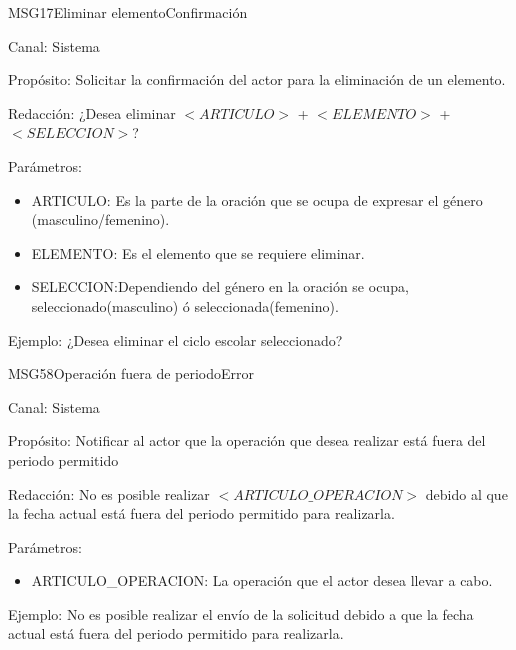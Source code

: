 \begin{mensaje}{MSG17}{Eliminar elemento}{Confirmación}
	\item[Canal:] Sistema
	\item[Propósito:] Solicitar la confirmación del actor para la eliminación de un elemento.
	\item[Redacción:] ¿Desea eliminar $<ARTICULO>$ + $<ELEMENTO>$ + $<SELECCION>$?
	\item[Parámetros:] 
	\begin{itemize}
		\item ARTICULO: Es la parte de la oración que se ocupa de expresar el género (masculino/femenino).
		\item ELEMENTO: Es el elemento que se requiere eliminar.
		\item SELECCION:Dependiendo del género en la oración se ocupa, seleccionado(masculino)  ó seleccionada(femenino).
	\end{itemize}
	\item[Ejemplo:] ¿Desea eliminar el ciclo escolar seleccionado?
	
\end{mensaje}

\begin{mensaje}{MSG58}{Operación fuera de periodo}{Error}
	\item[Canal:] Sistema
	\item[Propósito:] Notificar al actor que la operación que desea realizar está fuera del periodo permitido
	\item[Redacción:] No es posible realizar $<ARTICULO\_OPERACION>$ debido al que la fecha actual está fuera del periodo permitido para realizarla.
	\item[Parámetros:] 
	\begin{itemize}
		\item ARTICULO\_OPERACION: La operación que el actor desea llevar a cabo.
	\end{itemize}
	\item[Ejemplo:] No es posible realizar el envío de la solicitud debido a que la fecha actual está fuera del periodo permitido para realizarla.
\end{mensaje}



